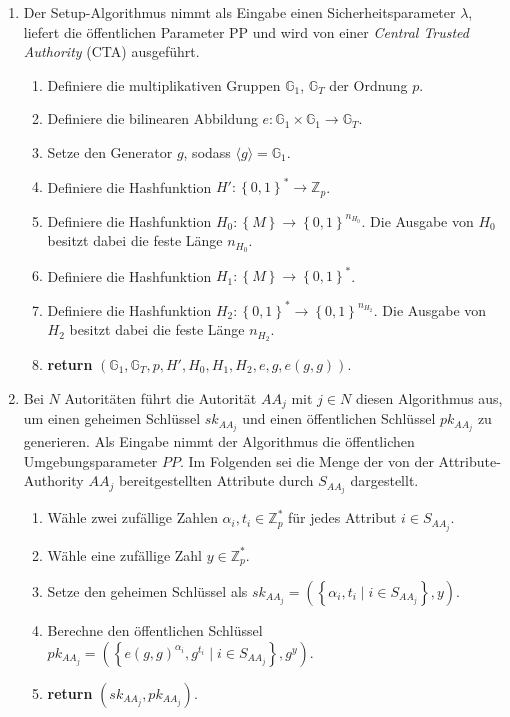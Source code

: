 \begin{enumerate}
	\item {} Der
		Setup-Algorithmus nimmt als Eingabe einen Sicherheitsparameter $\lambda$,
		liefert die öffentlichen Parameter $\text{PP}$ und wird von einer
		\textit{Central Trusted Authority} (CTA) ausgeführt.
		\begin{enumerate}
			\item Definiere die multiplikativen Gruppen $\mathbb{G}_1$,
				$\mathbb{G}_T$ der Ordnung $p$.
			\item Definiere die bilinearen Abbildung $e: \mathbb{G}_1 \times
				\mathbb{G}_1 \to \mathbb{G}_T$.
			\item Setze den Generator $g$, sodass $\langle g \rangle = \mathbb{G}_1$.
			\item Definiere die Hashfunktion $H' : \left\{ 0,1 \right\}^* \to
				\mathbb{Z}_p$.
			\item Definiere die Hashfunktion $H_0 : \left\{ M \right\} \to \left\{ 0,1
				\right\}^{n_{H_0}}$. Die Ausgabe von $H_0$ besitzt dabei die feste Länge
				$n_{H_0}$.
			\item Definiere die Hashfunktion $H_1 : \left\{ M \right\} \to
				\left\{ 0,1 \right\}^*$.
			\item Definiere die Hashfunktion $H_2 : \left\{ 0,1 \right\}^* \to \left\{
				0,1 \right\}^{n_{H_2}}$. Die Ausgabe von $H_2$ besitzt dabei die feste
				Länge $n_{H_2}$.
			\item \textbf{return} $\left( \mathbb{G}_1, \mathbb{G}_T, p, H', H_0, H_1,
				H_2, e, g, e(g, g)\right)$.
		\end{enumerate}

	\item {} Bei $N$
		Autoritäten führt die Autorität $AA_j$ mit $j \in N$ diesen Algorithmus
		aus, um einen geheimen Schlüssel $sk_{AA_j}$ und einen öffentlichen
		Schlüssel $pk_{AA_j}$ zu generieren. Als Eingabe nimmt der Algorithmus die
		öffentlichen Umgebungsparameter $PP$. Im Folgenden sei die Menge der von der
		Attribute-Authority $AA_j$ bereitgestellten Attribute durch $S_{AA_j}$
		dargestellt.
		\begin{enumerate}
			\item Wähle zwei zufällige Zahlen $\alpha_i, t_i \in \mathbb{Z}^*_p$ für
				jedes Attribut $i \in S_{AA_j}$.
			\item Wähle eine zufällige Zahl $y \in \mathbb{Z}^*_p$.
			\item Setze den geheimen Schlüssel als $sk_{AA_j} = \left(
				\left\{\alpha_i, t_i \;\vert\; i \in S_{AA_j}\right\}, y \right)$.
			\item Berechne den öffentlichen Schlüssel \\
				$pk_{AA_j} = \left( \left\{ e(g, g)^{\alpha_i}, g^{t_i} \;\vert\; i \in
				S_{AA_j} \right\}, g^y \right)$.
			\item \textbf{return} $\left( sk_{AA_j}, pk_{AA_j} \right)$.
		\end{enumerate}


\end{enumerate}
